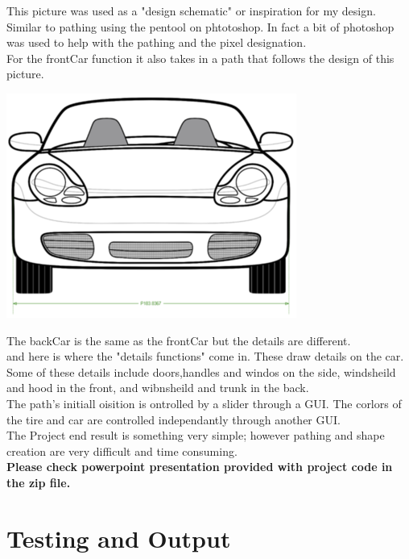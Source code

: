 \documentclass[letterpaper, 24pt, final, onecolumn, titlepage] {article}
\begin{document}
This picture was used as a "design schematic" or inspiration for my design. Similar to pathing using the pentool on phtotoshop. In fact a bit of photoshop was used to help with the pathing and the pixel designation.\\
For the frontCar function it also takes in a path that follows the design of this picture.\\
\begin{center}\includegraphics{frontDesign} \end{center}
The backCar is the same as the frontCar but the details are different.\\
and here is where the "details functions" come in. These draw details on the car. Some of these details include doors,handles and windos on the side, windsheild and hood in the front, and wibnsheild and trunk in the back.\\
The path's initiall oisition is ontrolled by a slider through a GUI. The corlors of the tire and car are controlled independantly through another GUI. \\
The Project end result is something very simple; however pathing and shape creation are very difficult and time consuming.\\
\textbf {Please check powerpoint presentation provided with project code in the zip file.}\\



\section{Testing and Output}
\end{document}
